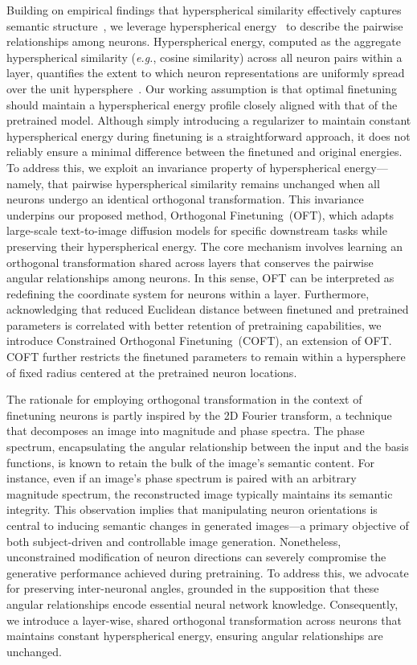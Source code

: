 Building on empirical findings that hyperspherical similarity effectively captures semantic structure~\cite{liu2017deep,liu2018decoupled,chen2020angular}, we leverage hyperspherical energy~\cite{liu2018learning} to describe the pairwise relationships among neurons. Hyperspherical energy, computed as the aggregate hyperspherical similarity (\emph{e.g.}, cosine similarity) across all neuron pairs within a layer, quantifies the extent to which neuron representations are uniformly spread over the unit hypersphere~\cite{liu2021learning}. Our working assumption is that optimal finetuning should maintain a hyperspherical energy profile closely aligned with that of the pretrained model. Although simply introducing a regularizer to maintain constant hyperspherical energy during finetuning is a straightforward approach, it does not reliably ensure a minimal difference between the finetuned and original energies. To address this, we exploit an invariance property of hyperspherical energy—namely, that pairwise hyperspherical similarity remains unchanged when all neurons undergo an identical orthogonal transformation. This invariance underpins our proposed method, Orthogonal Finetuning~(OFT), which adapts large-scale text-to-image diffusion models for specific downstream tasks while preserving their hyperspherical energy. The core mechanism involves learning an orthogonal transformation shared across layers that conserves the pairwise angular relationships among neurons. In this sense, OFT can be interpreted as redefining the coordinate system for neurons within a layer. Furthermore, acknowledging that reduced Euclidean distance between finetuned and pretrained parameters is correlated with better retention of pretraining capabilities, we introduce Constrained Orthogonal Finetuning~(COFT), an extension of OFT. COFT further restricts the finetuned parameters to remain within a hypersphere of fixed radius centered at the pretrained neuron locations.

The rationale for employing orthogonal transformation in the context of finetuning neurons is partly inspired by the 2D Fourier transform, a technique that decomposes an image into magnitude and phase spectra. The phase spectrum, encapsulating the angular relationship between the input and the basis functions, is known to retain the bulk of the image’s semantic content. For instance, even if an image’s phase spectrum is paired with an arbitrary magnitude spectrum, the reconstructed image typically maintains its semantic integrity. This observation implies that manipulating neuron orientations is central to inducing semantic changes in generated images—a primary objective of both subject-driven and controllable image generation. Nonetheless, unconstrained modification of neuron directions can severely compromise the generative performance achieved during pretraining. To address this, we advocate for preserving inter-neuronal angles, grounded in the supposition that these angular relationships encode essential neural network knowledge. Consequently, we introduce a layer-wise, shared orthogonal transformation across neurons that maintains constant hyperspherical energy, ensuring angular relationships are unchanged.


